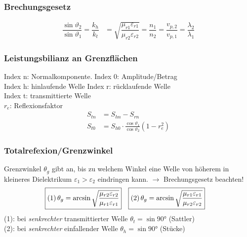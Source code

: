 \subsubsection{Brechungsgesetz}
\begin{align*}
	\dfrac{\sin \vartheta_{2}}{\sin \vartheta_{1}} = \dfrac{k_{h}}{k_{t}} & = \sqrt{\dfrac{\mu_{r 1} \varepsilon_{r 1}}{\mu_{r 2} \varepsilon_{r 2}}} = \dfrac{n_{1}}{n_{2}} = \dfrac{v_{p, 2}}{v_{p, 1}} = \dfrac{\lambda_{2}}{\lambda_{1}}
\end{align*}

\subsubsection{Leistungsbilianz an Grenzflächen}
Index n: Normalkomponente. \quad Index 0: Amplitude/Betrag\\
Index h: hinlaufende Welle \quad Index r: rücklaufende Welle\\
Index t: transmittierte Welle\\ 
$r_e$: Reflexionsfaktor 
\begin{align*}
	S_{tn} &= S_{hn} - S_{rn}\\ 
	S_{t0} &= S_{h0}\cdot \frac{\cos\vartheta_{1}}{\cos\vartheta_{2}}(1-r_e^2)
\end{align*}

\newcolumn
\subsubsection{Totalrefexion/Grenzwinkel}
Grenzwinkel $ \theta_g $ gibt an, bis zu welchem Winkel eine Welle von höherem in kleineres Dielektrikum $ \varepsilon_1 > \varepsilon_2 $ eindringen kann. $ \rightarrow $ Brechungsgesetz beachten!
\begin{align*}
	\Aboxed{(1) \, \theta_g & = \arcsin \sqrt{\frac{\mu_{r2}\varepsilon_{r2}}{\mu_{r1}\varepsilon_{r1}}} } &
	\Aboxed{(2) \, \theta_g & = \arcsin \sqrt{ \dfrac{\mu_{r1} \varepsilon_{r1}}{\mu_{r2} \varepsilon_{r2}}}}
&
\end{align*}
(1): bei \textit{senkrechter} transmittierter Welle $ \theta_t = \sin \ang{90}$ (Sattler)\\
(2): bei \textit{senkrechter} einfallender Welle $ \theta_h = \sin \ang{90}$ (Stücke)

